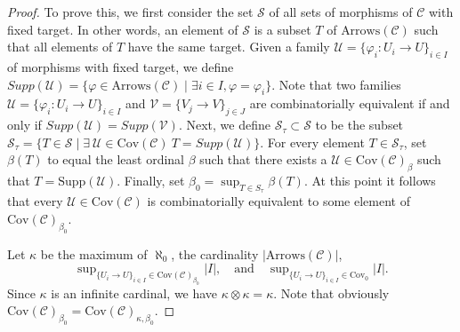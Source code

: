 \begin{proof}
To prove this, we first consider the set $\mathcal{S}$ of all
sets of morphisms of $\mathcal{C}$ with fixed target.
In other words, an element of $\mathcal{S}$ is a subset $T$
of $\text{Arrows}(\mathcal{C})$ such that all
elements of $T$ have the same target. Given a family
$\mathcal{U} = \{\varphi_i : U_i \to U\}_{i\in I}$ of morphisms with fixed
target, we define
$Supp(\mathcal{U}) = \{ \varphi \in \text{Arrows}(\mathcal{C})
\mid \exists i\in I, \varphi = \varphi_i\}$.
Note that two families $\mathcal{U} =  \{\varphi_i : U_i \to U\}_{i\in I}$
and $\mathcal{V} = \{V_j \to V\}_{j \in J}$ are combinatorially
equivalent if and only if $Supp(\mathcal{U}) = Supp(\mathcal{V})$.
Next, we define
$\mathcal{S}_\tau \subset \mathcal{S}$ to be the subset
$\mathcal{S}_\tau = \{ T \in \mathcal{S} \mid
\exists\ \mathcal{U} \in \text{Cov}(\mathcal{C}) \ T = Supp(\mathcal{U})\}$.
For every element $T \in \mathcal{S}_\tau$, set
$\beta(T)$ to equal the least ordinal $\beta$ such that
there exists a $\mathcal{U} \in \text{Cov}(\mathcal{C})_\beta$
such that $T = \text{Supp}(\mathcal{U})$. Finally, set
$\beta_0 = \sup_{T \in S_\tau} \beta(T)$.
At this point it follows that every $\mathcal{U} \in \text{Cov}(\mathcal{C})$
is combinatorially equivalent to some element
of $\text{Cov}(\mathcal{C})_{\beta_0}$.

\medskip\noindent
Let $\kappa$ be the maximum of $\aleph_0$,
the cardinality $|\text{Arrows}(\mathcal{C})|$,
$$
\sup\nolimits_{\{U_i \to U\}_{i\in I} \in \text{Cov}(\mathcal{C})_{\beta_0}}
|I|,
\quad\text{and}\quad
\sup\nolimits_{\{U_i \to U\}_{i\in I} \in \text{Cov}_0} |I|.
$$
Since $\kappa$ is an infinite cardinal, we have
$\kappa \otimes \kappa = \kappa$. Note that obviously
$\text{Cov}(\mathcal{C})_{\beta_0} =
\text{Cov}(\mathcal{C})_{\kappa, \beta_0}$.


\end{proof}

